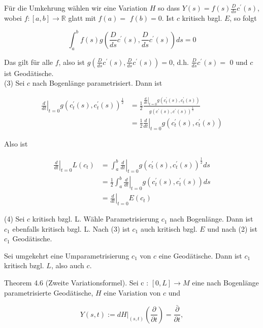 \documentclass[10pt]{article}
\begin{document}
Für die Umkehrung wählen wir eine Variation $H$ so dass $Y(s)=f(s) \frac{D}{d s} c^{\prime}(s)$, wobei $f:[a, b] \rightarrow \mathbb{R}$ glatt mit $f(a)=$ $f(b)=0$. Ist $c$ kritisch bzgl. $E$, so folgt

$$
\int_{a}^{b} f(s) g\left(\frac{D}{d s} c^{\prime}(s), \frac{D}{d s} c^{\prime}(s)\right) d s=0
$$

Das gilt für alle $f$, also ist $g\left(\frac{D}{d s} c^{\prime}(s), \frac{D}{d s} c^{\prime}(s)\right)=0$, d.h. $\frac{D}{d s} c^{\prime}(s)=$ 0 und $c$ ist Geodätische.\\
(3) Sei $c$ nach Bogenlänge parametrisiert. Dann ist

$$
\begin{aligned}
\left.\frac{d}{d t}\right|_{t=0} g\left(c_{t}^{\prime}(s), c_{t}^{\prime}(s)\right)^{\frac{1}{2}} & =\frac{1}{2} \frac{\left.\frac{d}{d t}\right|_{t=0} g\left(c_{t}^{\prime}(s), c_{t}^{\prime}(s)\right)}{g\left(c^{\prime}(s), c^{\prime}(s)\right)^{\frac{1}{2}}} \\
& =\left.\frac{1}{2} \frac{d}{d t}\right|_{t=0} g\left(c_{t}^{\prime}(s), c_{t}^{\prime}(s)\right)
\end{aligned}
$$

Also ist

$$
\begin{aligned}
\left.\frac{d}{d t}\right|_{t=0} L\left(c_{t}\right) & =\left.\int_{a}^{b} \frac{d}{d t}\right|_{t=0} g\left(c_{t}^{\prime}(s), c_{t}^{\prime}(s)\right)^{\frac{1}{2}} d s \\
& =\left.\frac{1}{2} \int_{a}^{b} \frac{d}{d t}\right|_{t=0} g\left(c_{t}^{\prime}(s), c_{t}^{\prime}(s)\right) d s \\
& =\left.\frac{d}{d t}\right|_{t=0} E\left(c_{t}\right)
\end{aligned}
$$

(4) Sei $c$ kritisch bzgl. L. Wähle Parametrisierung $c_{1}$ nach Bogenlänge. Dann ist $c_{1}$ ebenfalls kritisch bzgl. L. Nach (3) ist $c_{1}$ auch kritisch bzgl. $E$ und nach (2) ist $c_{1}$ Geodätische.

Sei umgekehrt eine Umparametrisierung $c_{1}$ von $c$ eine Geodätische. Dann ist $c_{1}$ kritisch bzgl. $L$, also auch $c$.

Theorem 4.6 (Zweite Variationsformel). Sei c : $[0, L] \rightarrow M$ eine nach Bogenlänge parametrisierte Geodätische, $H$ eine Variation von $c$ und

$$
Y(s, t):=\left.d H\right|_{(s, t)}\left(\frac{\partial}{\partial t}\right)=\frac{\bar{\partial}}{\partial t},
$$
\end{document}
